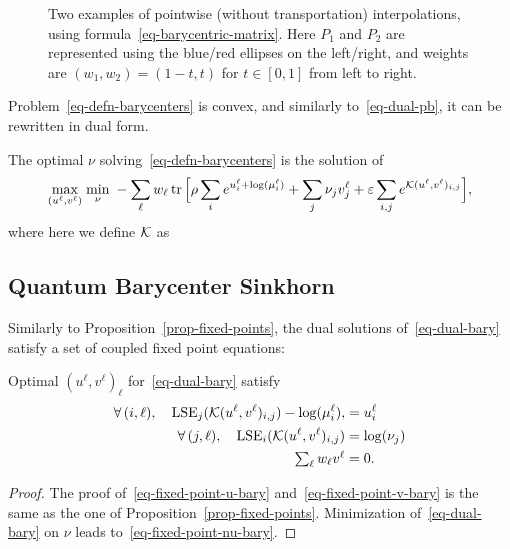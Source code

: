 \begin{figure}\centering
{}
\caption{Two examples of pointwise (without transportation) interpolations, using formula~\eqref{eq-barycentric-matrix}. Here $P_1$ and $P_2$ are represented using the blue/red ellipses on the left/right, and weights are $(w_1,w_2)=(1-t,t)$ for $t \in [0,1]$ from left to right.} \label{fig:interp}
\end{figure}






Problem~\eqref{eq-defn-barycenters} is convex, and similarly to~\eqref{eq-dual-pb}, it can be rewritten in dual form.

\begin{prop}
The optimal $\nu$ solving~\eqref{eq-defn-barycenters} is the solution of
\begin{multline}\label{eq-dual-bary}		
		\underset{(u^\ell,v^\ell)}{\max}\; \underset{\nu}{\min}\;
				- 
				\sum_\ell w_\ell 
					\operatorname{tr}\Big[
						\rho \sum_i e^{u_i^\ell+\log(\mu_i^\ell)} 
					+    \sum_j \nu_j v_j^\ell
					+    \varepsilon \sum_{i,j}  e^{ \mathcal{K}(u^\ell,v^\ell)_{i,j} }
			 \Big], 
\end{multline}	
where here we define $\mathcal{K}$ as
\end{prop}





\subsection{Quantum Barycenter Sinkhorn}

Similarly to Proposition~\ref{prop-fixed-points}, the dual solutions of~\eqref{eq-dual-bary} satisfy a set of coupled fixed point equations:

\begin{prop}
Optimal $(u^\ell,v^\ell)_\ell$ for~\eqref{eq-dual-bary} satisfy 
\begin{align}
	\forall \, (i,\ell), \quad \operatorname{LSE}_j(\mathcal{K}(u^\ell,v^\ell)_{i,j})-\log(\mu_i^\ell), \label{eq-fixed-point-u-bary} 
		&= u_i^\ell \\
	\forall \, (j,\ell), \quad \operatorname{LSE}_i(\mathcal{K}(u^\ell,v^\ell)_{i,j}) \label{eq-fixed-point-v-bary}
		&= \log(\nu_j)\\ 
		 \textstyle \sum_\ell w_\ell v^\ell &= 0. \label{eq-fixed-point-nu-bary}
\end{align}
\end{prop}
\begin{proof}
The proof of~\eqref{eq-fixed-point-u-bary} and~\eqref{eq-fixed-point-v-bary} is the same as the one of Proposition~\ref{prop-fixed-points}.
Minimization of~\eqref{eq-dual-bary} on $\nu$ leads to~\eqref{eq-fixed-point-nu-bary}. 
\end{proof}

